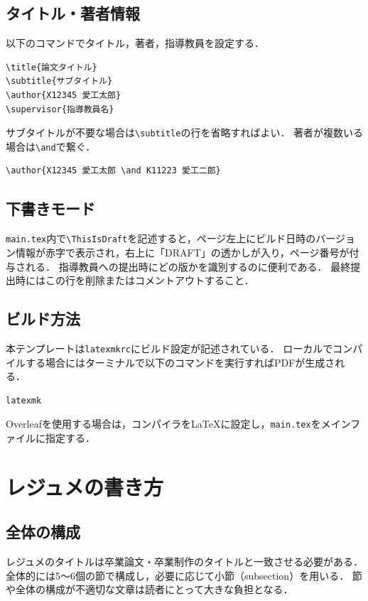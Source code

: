 \subsection{タイトル・著者情報}
\label{subsec:title}
以下のコマンドでタイトル，著者，指導教員を設定する．
\begin{lstlisting}[language={[LaTeX]TeX}, numbers=none, frame=single]
\title{論文タイトル}
\subtitle{サブタイトル}
\author{X12345 愛工太郎}
\supervisor{指導教員名}
\end{lstlisting}
サブタイトルが不要な場合は\verb|\subtitle|の行を省略すればよい．
著者が複数いる場合は\verb|\and|で繋ぐ．
\begin{lstlisting}[language={[LaTeX]TeX}, numbers=none, frame=single]
\author{X12345 愛工太郎 \and K11223 愛工二郎}
\end{lstlisting}

\subsection{下書きモード}
\label{subsec:draft}
\texttt{main.tex}内で\verb|\ThisIsDraft|を記述すると，ページ左上にビルド日時のバージョン情報が赤字で表示され，右上に「DRAFT」の透かしが入り，ページ番号が付与される．
指導教員への提出時にどの版かを識別するのに便利である．
最終提出時にはこの行を削除またはコメントアウトすること．

\subsection{ビルド方法}
\label{subsec:build}
本テンプレートは\texttt{latexmkrc}にビルド設定が記述されている．
ローカルでコンパイルする場合にはターミナルで以下のコマンドを実行すればPDFが生成される．
\begin{lstlisting}[language=bash, numbers=none, frame=single]
latexmk
\end{lstlisting}
Overleafを使用する場合は，コンパイラをLaTeXに設定し，\texttt{main.tex}をメインファイルに指定する．

\section{レジュメの書き方}
\label{sec:writing}

\subsection{全体の構成}
\label{subsec:structure}
レジュメのタイトルは卒業論文・卒業制作のタイトルと一致させる必要がある．
全体的には5〜6個の節で構成し，必要に応じて小節（subsection）を用いる．
節や全体の構成が不適切な文章は読者にとって大きな負担となる\cite{kisaragi}．

